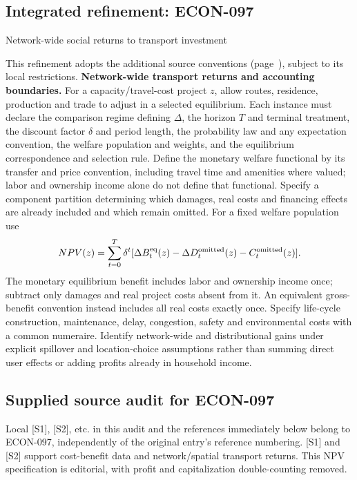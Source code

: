 \documentclass[11pt,a4paper]{article}
\begin{document}
\subsection*{Integrated refinement: ECON-097}
{\sffamily\small\color{muted}Network-wide social returns to transport investment\par}
This refinement adopts the additional source conventions
(page~\pageref{audited:conventions}), subject to its local restrictions.
\textbf{Network-wide transport returns and accounting boundaries.}
For a capacity/travel-cost project $z$, allow routes, residence, production and
trade to adjust in a selected equilibrium. Each instance must declare the comparison regime defining $\Delta$, the horizon $T$ and terminal treatment, the discount factor $\delta$ and period length, the probability law and any expectation convention, the welfare population and weights, and the equilibrium correspondence and selection rule. Define the monetary welfare functional by its transfer and price convention, including travel time and amenities where valued; labor and ownership income alone do not define that functional. Specify a component partition determining which damages, real costs and financing effects are already included and which remain omitted. For a fixed welfare population use
\[
NPV(z)=\sum_{t=0}^{T}\delta^t
[\Delta B_t^{\rm eq}(z)-\Delta D_t^{\rm omitted}(z)-C_t^{\rm omitted}(z)].
\]
The monetary equilibrium benefit includes labor and ownership income once;
subtract only damages and real project costs absent from it. An equivalent
gross-benefit convention instead includes all real costs exactly once.
Specify life-cycle construction, maintenance, delay, congestion, safety and
environmental costs with a common numeraire. Identify network-wide and
distributional gains under explicit spillover and location-choice assumptions
rather than summing direct user effects or adding profits already in household
income.
\subsection*{Supplied source audit for ECON-097}
Local [S1], [S2], etc. in this audit and the references immediately below
belong to ECON-097, independently of the original entry's reference numbering.
[S1] and [S2] support cost-benefit data and network/spatial transport returns. This NPV specification is editorial, with profit and capitalization double-counting removed.
\end{document}
